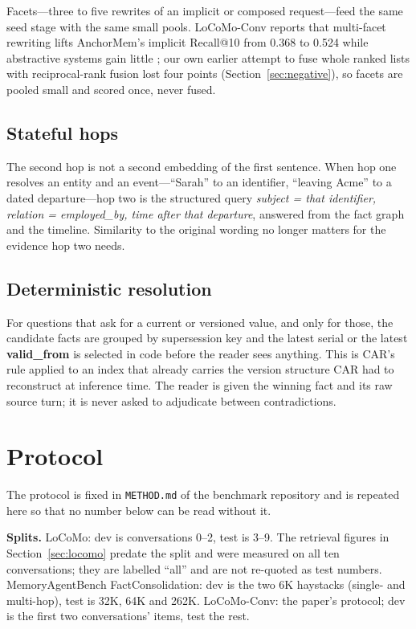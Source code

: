 \documentclass[11pt]{article}
\begin{document}
Facets---three to five rewrites of an implicit or composed
request---feed the same seed stage with the same small pools. LoCoMo-Conv
reports that multi-facet rewriting lifts AnchorMem's implicit Recall@10 from
0.368 to 0.524 while abstractive systems gain little \cite{locomoconv}; our
own earlier attempt to fuse whole ranked lists with reciprocal-rank fusion
lost four points (Section~\ref{sec:negative}), so facets are pooled small
and scored once, never fused.

\subsection{Stateful hops}

The second hop is not a second embedding of the first sentence. When hop one
resolves an entity and an event---``Sarah'' to an identifier, ``leaving
Acme'' to a dated departure---hop two is the structured query
\emph{subject = that identifier, relation = employed\_by, time after that
departure}, answered from the fact graph and the timeline. Similarity to the
original wording no longer matters for the evidence hop two needs.

\subsection{Deterministic resolution}

For questions that ask for a current or versioned value, and only for
those, the candidate facts are grouped by supersession key and the latest
serial or the latest \textbf{valid\_from} is selected in code before the
reader sees anything. This is CAR's rule \cite{car} applied to an index that
already carries the version structure CAR had to reconstruct at inference
time. The reader is given the winning fact and its raw source turn; it is
never asked to adjudicate between contradictions.

\section{Protocol}
\label{sec:protocol}

The protocol is fixed in \texttt{METHOD.md} of the benchmark repository and
is repeated here so that no number below can be read without it.

\textbf{Splits.} LoCoMo: dev is conversations 0--2, test is 3--9. The
retrieval figures in Section~\ref{sec:locomo} predate the split and were
measured on all ten conversations; they are labelled ``all'' and are not
re-quoted as test numbers. MemoryAgentBench FactConsolidation: dev is the
two 6K haystacks (single- and multi-hop), test is 32K, 64K and 262K.
LoCoMo-Conv: the paper's protocol; dev is the first two conversations'
items, test the rest.
\end{document}
